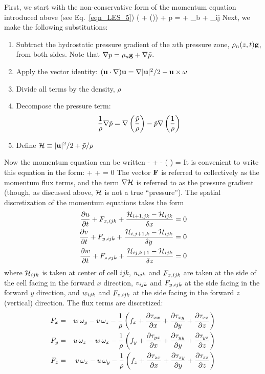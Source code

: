 First, we start with the non-conservative form of the momentum equation introduced above (see Eq.~\ref{eqn_LES_5})
\be \rho \left(  + (\bu \cdot \nabla)\bu  \right) + \nabla p = \rho \bg + \bof_b + \nabla\!\cdot \btau_{ij}  \label{momentum} \ee
Next, we make the following substitutions:
\begin{enumerate}
\item Subtract the hydrostatic pressure gradient of the $n$th pressure zone, $\rho_n(z,t) {\bf g}$, from both sides. Note that
$\nabla p=\rho_n {\bf g} + \nabla \tilde{p}$.
\item Apply the vector identity: $({\bf u} \cdot \nabla) {\bf u} = \nabla|{\bf u}|^2/2 - {\bf u}\times{\bf \omega} $
\item Divide all terms by the density, $\rho$
\item Decompose the pressure term:
   $$ \frac{1}{\rho} \nabla \tilde{p} = \nabla \left( \frac{\tilde{p}}{\rho}\right) - \tilde{p} \nabla \left(\frac{1}{\rho} \right)  $$
\item Define ${\cal H} \equiv |{\bf u}|^2/2 + \tilde{p}/\rho $
\end{enumerate}
Now the momentum equation can be written
\be {} - \bu\times\bo +  - \tp \nabla \left( \right) =    \label{momeq} \ee
It is convenient to write this equation in the form:
\be {} + \bF + \nabla \cH = 0 \label{simple_momentum_equation} \ee
The vector ${\bf F}$ is referred to collectively as the momentum flux terms, and the term $\nabla {\cal H}$ is referred to as the
pressure gradient (though, as discussed above, ${\cal H}$ is not a true ``pressure''). The spatial discretization of the momentum equations takes the form
\begin{eqnarray}
\frac{\partial u}{\partial t} + F_{x,ijk} + \frac{{\cal H}_{i+1,jk} -{\cal H}_{ijk}}{\delta x} = 0  \label{umom} \\
\frac{\partial v}{\partial t} + F_{y,ijk} + \frac{{\cal H}_{i,j+1,k}-{\cal H}_{ijk}}{\delta y} = 0  \label{vmom} \\
\frac{\partial w}{\partial t} + F_{z,ijk} + \frac{{\cal H}_{ij,k+1} -{\cal H}_{ijk}}{\delta z} = 0  \label{wmom}
\end{eqnarray}
where ${\cal H}_{ijk}$ is taken at center of cell $ijk$,
$u_{ijk}$ and $F_{x,ijk}$ are taken at the side of the cell facing
in the forward $x$ direction, $v_{ijk}$ and $F_{y,ijk}$ at the side
facing in the forward $y$ direction, and $w_{ijk}$ and $F_{z,ijk}$
at the side facing in the forward $z$ (vertical) direction.
The flux terms are discretized:
\begin{eqnarray}
F_x &=& w \, \omega_y - v \, \omega_z - \frac{1}{\rho} \left( f_x
  +  \frac{\partial \tau_{xx}}{\partial x} + \frac{\partial \tau_{xy}}{\partial y} + \frac{\partial \tau_{xz}}{\partial z} \right) \\
F_y &=& u \, \omega_z - w \, \omega_x - \frac{1}{\rho} \left( f_y
  +  \frac{\partial \tau_{yx}}{\partial x} + \frac{\partial \tau_{yy}}{\partial y} + \frac{\partial \tau_{yz}}{\partial z} \right) \\
F_z &=& v \, \omega_x - u \, \omega_y - \frac{1}{\rho} \left( f_z
  +  \frac{\partial \tau_{zx}}{\partial x} + \frac{\partial \tau_{zy}}{\partial y} + \frac{\partial \tau_{zz}}{\partial z} \right)
\end{eqnarray}
